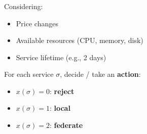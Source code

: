 \documentclass[aspectratio=169]{beamer}
\begin{document}
\begin{frame}
    \frametitle{\secname}
    \framesubtitle{\subsecname}

    Considering:
    \begin{itemize}
        \item Price changes
        \item Available resources (CPU, memory, disk)
        \item Service lifetime (e.g., 2 days)
    \end{itemize} \pause
    For each service $\sigma$, decide / take an \textbf{action}:
    \begin{itemize}
        \item $x(\sigma)=0$: \textbf{reject} 
        \item $x(\sigma)=1$: \textbf{local} 
        \item $x(\sigma)=2$: \textbf{federate}
    \end{itemize}
\end{frame}
\end{document}

